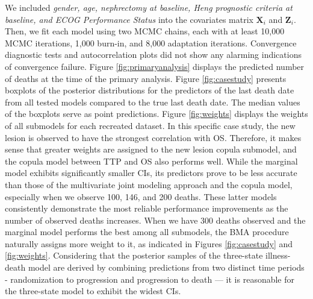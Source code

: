 We included \textit{gender, age, nephrectomy at baseline, Heng prognostic criteria at baseline, and ECOG Performance Status} into the covariates matrix $\textbf{X}_i$ and $\textbf{Z}_i$. Then, we fit each model using two \ac{MCMC}  chains, each with at least 10,000 \ac{MCMC}  iterations, 1,000 burn-in, and 8,000 adaptation iterations.  Convergence diagnostic tests and autocorrelation plots did not show any alarming indications of convergence failure. Figure \ref{fig:primaryanalysis} displays the predicted number of deaths at the time of the primary analysis. Figure \ref{fig:casestudy} presents boxplots of the posterior distributions for the predictors of the last death date from all tested models compared to the true last death date. The median values of the boxplots serve as point predictions. Figure \ref{fig:weights} displays the weights of all submodels for each recreated dataset. In this specific case study, the new lesion is observed to have the strongest correlation with OS. Therefore, it makes sense that greater weights are assigned to the new lesion copula submodel, and the copula model between \ac{TTP} and \ac{OS} also performs well. While the marginal model exhibits significantly smaller \ac{CI}s, its predictors prove to be less accurate than those of the multivariate joint modeling approach and the copula model, especially when we observe 100, 146, and 200 deaths. These latter models consistently demonstrate the most reliable performance improvements as the number of observed deaths increases. When we have 300 deaths observed and the marginal model performs the best among all submodels, the \ac{BMA} procedure naturally assigns more weight to it, as indicated in Figures \ref{fig:casestudy} and \ref{fig:weights}. Considering that the posterior samples of the three-state illness-death model are derived by combining predictions from two distinct time periods - randomization to progression and progression to death — it is reasonable for the three-state model to exhibit the widest \ac{CI}s. 

